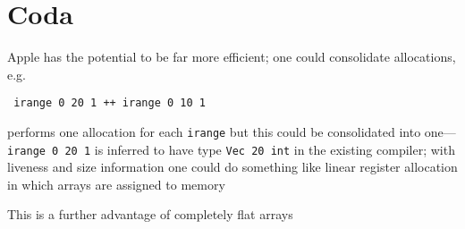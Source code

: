 \documentclass[sigplan,screen]{acmart}
\begin{document}
\section{Coda}

Apple has the potential to be far more efficient; one could consolidate allocations, e.g.

\begin{verbatim}
 irange 0 20 1 ++ irange 0 10 1
\end{verbatim}
performs one allocation for each {\tt irange} but this could be consolidated into one---{\tt irange 0 20 1} is inferred to have type {\tt Vec 20 int} in the existing compiler; with liveness and size information one could do something like linear register allocation in which arrays are assigned to memory

This is a further advantage of completely flat arrays




\end{document}
